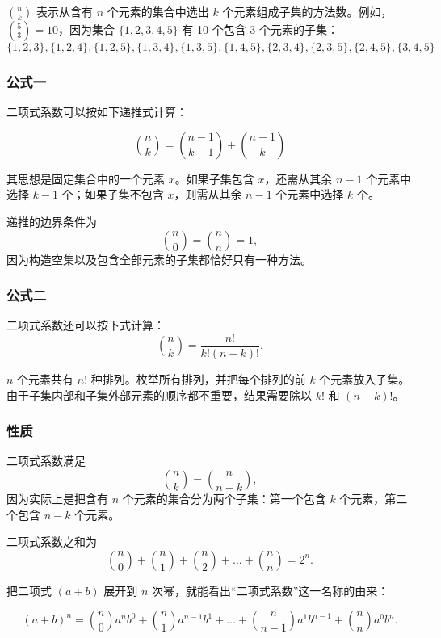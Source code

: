 
 ${n \choose k}$ 表示从含有 $n$ 个元素的集合中选出 $k$ 个元素组成子集的方法数。例如，${5 \choose 3}=10$，因为集合 $\{1,2,3,4,5\}$ 有 10 个包含 3 个元素的子集：
\[ \{1,2,3\}, \{1,2,4\}, \{1,2,5\}, \{1,3,4\}, \{1,3,5\}, 
\{1,4,5\}, \{2,3,4\}, \{2,3,5\}, \{2,4,5\}, \{3,4,5\} \]

\subsubsection{公式一}

二项式系数可以按如下递推式计算：

\[
{n \choose k}  =  {n-1 \choose k-1} + {n-1 \choose k}
\]

其思想是固定集合中的一个元素 $x$。如果子集包含 $x$，还需从其余 $n-1$ 个元素中选择 $k-1$ 个；如果子集不包含 $x$，则需从其余 $n-1$ 个元素中选择 $k$ 个。

递推的边界条件为
\[
{n \choose 0}  =  {n \choose n} = 1,
\]
因为构造空集以及包含全部元素的子集都恰好只有一种方法。

\subsubsection{公式二}

二项式系数还可以按下式计算：
\[
{n \choose k}  =  \frac{n!}{k!(n-k)!}.
\]

$n$ 个元素共有 $n!$ 种排列。枚举所有排列，并把每个排列的前 $k$ 个元素放入子集。由于子集内部和子集外部元素的顺序都不重要，结果需要除以 $k!$ 和 $(n-k)!$。

\subsubsection{性质}

二项式系数满足
\[
{n \choose k}  =  {n \choose n-k},
\]
因为实际上是把含有 $n$ 个元素的集合分为两个子集：第一个包含 $k$ 个元素，第二个包含 $n-k$ 个元素。

二项式系数之和为
\[
{n \choose 0}+{n \choose 1}+{n \choose 2}+\ldots+{n \choose n}=2^n.
\]

把二项式 $(a+b)$ 展开到 $n$ 次幂，就能看出“二项式系数”这一名称的由来：

\[ (a+b)^n =
{n \choose 0} a^n b^0 + 
{n \choose 1} a^{n-1} b^1 +
\ldots + 
{n \choose n-1} a^1 b^{n-1} +
{n \choose n} a^0 b^n. \]


